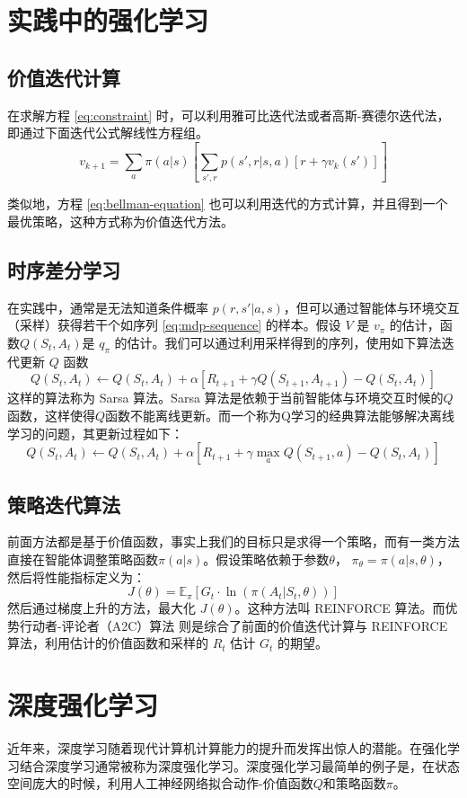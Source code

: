 \section{实践中的强化学习}
\subsection{价值迭代计算}
在求解方程 \ref{eq:constraint} 时，可以利用雅可比迭代法或者高斯-赛德尔迭代法，即通过下面迭代公式解线性方程组。
\begin{equation}
    v_{k+1} = \sum_a \pi(a|s) \left[ \sum_{s', r} p(s', r | s, a)  \left[r + \gamma v_k(s') \right] \right]
\end{equation}

类似地，方程 \ref{eq:bellman-equation} 也可以利用迭代的方式计算，并且得到一个最优策略，这种方式称为价值迭代方法。

\subsection{时序差分学习}
在实践中，通常是无法知道条件概率 $p(r, s' | a, s)$，但可以通过智能体与环境交互（采样）获得若干个如序列 \ref{eq:mdp-sequence} 的样本。假设 $V$ 是 $v_\pi$ 的估计，函数$Q(S_t, A_t)$是 $q_\pi$ 的估计。我们可以通过利用采样得到的序列，使用如下算法迭代更新 $Q$ 函数
\begin{equation}
    Q(S_t, A_t) \leftarrow Q(S_t, A_t) + \alpha \left[ R_{t+1} + \gamma Q(S_{t+1}, A_{t+1}) - Q(S_t, A_t) \right]
\end{equation}
这样的算法称为 Sarsa 算法\cite{suttonReinforcementLearningIntroduction2018}。Sarsa 算法是依赖于当前智能体与环境交互时候的$Q$函数，这样使得$Q$函数不能离线更新。而一个称为Q学习\cite{watkinsQlearning1992}的经典算法能够解决离线学习的问题，其更新过程如下：
\begin{equation}
    Q(S_t, A_t) \leftarrow Q(S_t, A_t) + \alpha \left[ R_{t+1} + \gamma \max_{a} Q(S_{t+1}, a) - Q(S_t, A_t) \right]
\end{equation}


\subsection{策略迭代算法}
前面方法都是基于价值函数，事实上我们的目标只是求得一个策略，而有一类方法直接在智能体调整策略函数$\pi(a|s)$。假设策略依赖于参数$\theta$， $\pi_\theta = \pi(a|s,\theta)$，然后将性能指标定义为：
\begin{equation}
    J(\theta) = \mathbb{E}_\pi \left[ G_t \cdot  \ln(\pi(A_t|S_t, \theta))  \right]
\end{equation}
然后通过梯度上升的方法，最大化 $J(\theta)$。这种方法叫 REINFORCE 算法。而优势行动者-评论者（A2C）算法 \cite{mnihAsynchronousMethodsDeep2016} 则是综合了前面的价值迭代计算与 REINFORCE 算法，利用估计的价值函数和采样的 $R_t$ 估计 $G_t$ 的期望。

\section{深度强化学习}
    近年来，深度学习随着现代计算机计算能力的提升而发挥出惊人的潜能。在强化学习结合深度学习通常被称为深度强化学习。深度强化学习最简单的例子是，在状态空间庞大的时候，利用人工神经网络拟合动作-价值函数$Q$和策略函数$\pi$。


